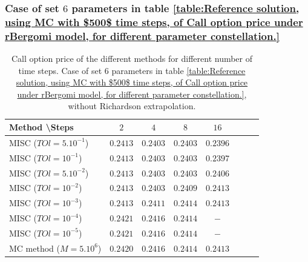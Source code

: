 \documentclass[11pt]{article}
\begin{document}
\FloatBarrier
\subsubsection{Case of set $6$ parameters in table \ref{table:Reference solution, using MC with $500$ time steps, of Call option price under rBergomi model, for different parameter constellation.}}\label{sec:Case of set 6 parameters}

\begin{table}[h!]
	\centering
	\begin{tabular}{l*{6}{c}r}
		Method \textbackslash  Steps            & $2$ & $4$ & $8$ & $16$ &   \\
		\hline
		MISC ($TOl=5.10^{-1}$)  & $0.2413$ & $0.2403$ & $0.2403$ & $0.2396$  \\
		MISC ($TOl=10^{-1}$)  & $0.2413$ &$0.2403$& $0.2403$ & $0.2397$   \\
		MISC ($TOl=5.10^{-2}$)  &$0.2413$ & $0.2403$ & $0.2403$ & $0.2406$  \\
		MISC ($TOl=10^{-2}$)  &$0.2413$ & $0.2403$ & $0.2409$ & $0.2413$  \\
		
		MISC ($TOl=10^{-3}$)  & $0.2413$ & $0.2411$ & $0.2414$ & $0.2413$  \\
		MISC ($TOl=10^{-4}$)  &  $0.2421$ & $0.2416$ & $0.2414$ & $-$  \\
		
		MISC ($TOl=10^{-5}$)  & $0.2421$ &$0.2416$ &  $0.2414$ & $-$  \\
		\hline
		MC method ($M=5.10^{6}$)   & $0.2420$ & $0.2416$  & $0.2414$ & $0.2413$ \\		
		
		\hline
	\end{tabular}
	\caption{ Call option price of the different methods for different number of time steps. Case of set $6$ parameters in table \ref{table:Reference solution, using MC with $500$ time steps, of Call option price under rBergomi model, for different parameter constellation.}, without Richardson extrapolation.}
	\label{table: Call option price of the different methods for different number of time steps. Case set 6}
\end{table}
\end{document}
